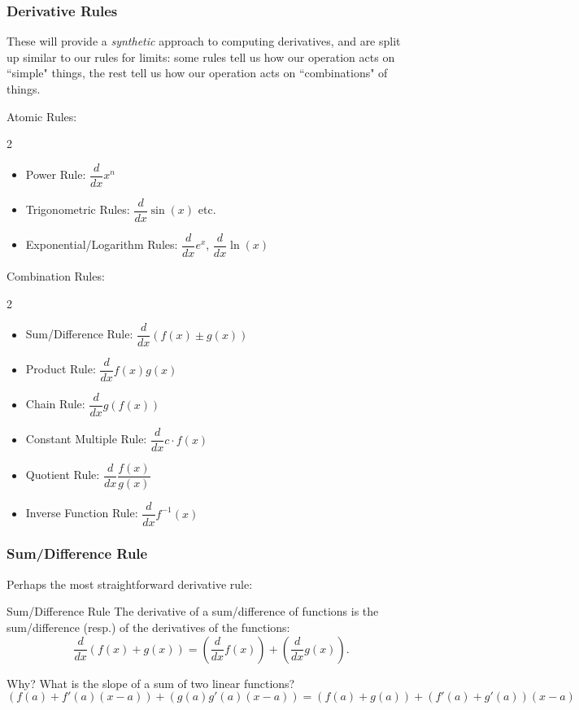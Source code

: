 \documentclass{ltx-talk}
\begin{document}
\begin{frame}
  \frametitle{Derivative Rules}

  These will provide a \textit{synthetic} approach to computing derivatives, and are split up similar to our rules for limits: \pause some rules tell us how our operation acts on ``simple" things, \pause the rest tell us how our operation acts on ``combinations" of things.

  Atomic Rules: \pause
  \begin{multicols}{2}
    \begin{itemize}
      \item Power Rule: $\dfrac{d}{dx} x^n$ 
      \item Trigonometric Rules: $\dfrac{d}{dx} \sin(x)$ etc.
      \item Exponential/Logarithm Rules: $\dfrac{d}{dx} e^x$, $\dfrac{d}{dx} \ln(x)$
    \end{itemize}
  \end{multicols}

  Combination Rules: \pause
  \begin{multicols}{2}
    \begin{itemize}
      \item Sum/Difference Rule: $\dfrac{d}{dx} (f(x) \pm g(x))$ 
      \item Product Rule: $\dfrac{d}{dx} f(x)g(x)$ 
      \item Chain Rule: $\dfrac{d}{dx} g(f(x))$ 
      \item Constant Multiple Rule: $\dfrac{d}{dx} c \cdot f(x)$
      \item Quotient Rule: $\dfrac{d}{dx} \dfrac{f(x)}{g(x)}$ 
      \item Inverse Function Rule: $\dfrac{d}{dx} f^{-1}(x)$
    \end{itemize}
  \end{multicols}
\end{frame}

\begin{frame}
  \frametitle{Sum/Difference Rule}

  Perhaps the most straightforward derivative rule:
  \begin{block}{Sum/Difference Rule}
    The derivative of a sum/difference of functions
    is the sum/difference (resp.) of the derivatives of the functions: \pause
    \begin{equation}
      \dfrac{d}{dx} (f(x) + g(x)) = \left(\dfrac{d}{dx} f(x)\right) + \left(\dfrac{d}{dx} g(x)\right).
    \end{equation} \pause
  \end{block}

  Why? \pause What is the slope of a sum of two linear functions? \pause
  \begin{equation}
    (f(a) + f'(a)(x - a)) + (g(a) g'(a)(x - a)) = (f(a) + g(a)) + (f'(a) + g'(a))(x - a)
  \end{equation}
\end{frame}
\end{document}
